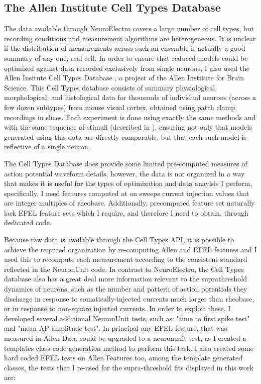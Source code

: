 \subsection{The Allen Institute Cell Types Database}
The data available through NeuroElectro covers a large number of cell types, but recording conditions and measurement algorithms are heterogeneous.
It is unclear if the distribution of measurements across such an ensemble is actually a good summary of any one, real cell.
In order to ensure that reduced models could be optimized against data recorded exclusively from single neurons, I also used the Allen Insitute Cell Types Database \cite{celltypes}, a project of the Allen Institute for Brain Science.
This Cell Types database consists of summary physiological, morphological, and histological data for thousands of individual neurons (across a few dozen subtypes) from mouse visual cortex, obtained using patch clamp recordings in slices.
Each experiment is done using exactly the same methods and with the same sequence of stimuli (described in \cite{celltypes}), ensuring not only that models generated using this data are directly comparable, but that each such model is reflective of a single neuron.

The Cell Types Database does provide some limited pre-computed measures of action potential waveform details, however, the data is not organized in a way that makes it is useful for the types of optimization and data anaylsis I perform,  specifically, I need features computed at on sweeps current injection values that are integer multiples of rheobase. Additionally, precomputed feature set naturally lack EFEL feature sets which I require, and therefore I need to obtain, through dedicated code.

Because raw data is available through the Cell Types API, it is possible to achieve the required organization by re-computing Allen and EFEL features and I used this to recompute each measurement according to the consistent standard reflected in the NeuronUnit code.
In contrast to NeuroElectro, the Cell Types database also has a great deal more information relevant to the suprathreshold dynamics of neurons, such as the number and pattern of action potentials they discharge in response to somatically-injected currents much larger than rheobase, or in response to non-square injected currents.
In order to exploit these, I developed several additional NeuronUnit tests, such as: "time to first spike test" and "mean AP amplitude test". In principal any EFEL feature, that was measured in Allen Data could be upgraded to a neuronunit test, as I created a templates class-code generation method to perform this task. I also created some hard coded EFEL tests on Allen Features too, among the template generated classes, the tests that I re-used for the supra-threshold fits displayed in this work are:

